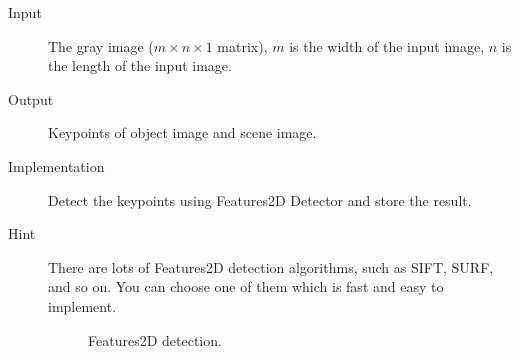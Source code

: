 \documentclass[12pt]{article}
\begin{document}
\begin{description}
\item[Input] The gray image ($m \times n \times 1$ matrix), $m$ is the width of the input image, $n$ is the length of the input image. 
\item[Output]  Keypoints of object image and scene image. 
\item[Implementation] Detect the keypoints using Features2D Detector and store the result.
\item[Hint] There are lots of Features2D detection algorithms, such as SIFT, SURF, and so on. You can choose one of them which is fast and easy to implement.
\begin{figure}[!ht]
  \centering 
  \caption{Features2D detection.}
  \label{fig:Features2D} %
\end{figure}
\end{description}
\end{document}
